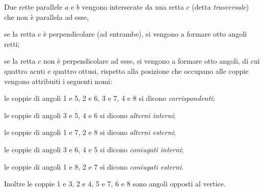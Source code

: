 Due rette parallele $a$ e $b$ vengono intersecate da una retta $c$ 
(detta \emph{trasversale}) che non è parallela ad esse,
\begin{itemize*}
  \item se la retta $c$ è perpendicolare (ad entrambe), si vengono a 
  formare otto angoli retti; 
  \item se la retta $c$ non è perpendicolare ad esse, si vengono a 
  formare otto angoli, di cui quattro acuti e quattro ottusi, rispetto 
  alla posizione che occupano alle coppie vengono attribuiti i seguenti 
  nomi: %
  \begin{itemize*}
    \item le coppie di angoli 1 e 5, 2 e 6, 3 e 7, 4 e 8 si dicono 
    \emph{corrispondenti};
    \item le coppie di angoli 3 e 5, 4 e 6 si dicono \emph{alterni 
      interni};
    \item le coppie di angoli 1 e 7, 2 e 8 si dicono \emph{alterni 
      esterni};
    \item le coppie di angoli 3 e 6, 4 e 5 si dicono \emph{coniugati 
      interni};
    \item le coppie di angoli 1 e 8, 2 e 7 si dicono \emph{coniugati 
      esterni}.
  \end{itemize*}
\end{itemize*}
Inoltre le coppie 1 e 3, 2 e 4, 5 e 7, 6 e 8 sono angoli opposti al 
vertice.


